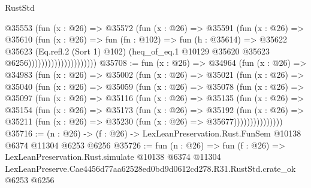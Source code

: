 \begin{lexlean}{RustStd}
\begin{coremodule}
                                  @35553
                                    (fun (x : @26) =>
                                    @35572
                                      (fun (x : @26) =>
                                      @35591
                                        (fun (x : @26) =>
                                        @35610
                                          (fun (x : @26) =>
                                          fun (fn : @102) =>
                                          fun (h : @35614) =>
                                          @35622
                                            @35623
                                            (Eq.refl.{2} (Sort 1) @102)
                                            (heq_of_eq.{1}
                                              @10129
                                              @35620
                                              @35623
                                              @6256)))))))))))))))))))))
@35708 := fun (x : @26) =>
  @34964
    (fun (x : @26) =>
    @34983
      (fun (x : @26) =>
      @35002
        (fun (x : @26) =>
        @35021
          (fun (x : @26) =>
          @35040
            (fun (x : @26) =>
            @35059
              (fun (x : @26) =>
              @35078
                (fun (x : @26) =>
                @35097
                  (fun (x : @26) =>
                  @35116
                    (fun (x : @26) =>
                    @35135
                      (fun (x : @26) =>
                      @35154
                        (fun (x : @26) =>
                        @35173
                          (fun (x : @26) =>
                          @35192
                            (fun (x : @26) =>
                            @35211 (fun (x : @26) => @35230 (fun (x : @26) => @35677)))))))))))))))
@35716 := (n : @26) -> (f : @26) -> LexLeanPreservation.Rust.FunSem @10138 @6374 @11304 @6253 @6256
@35726 := fun (n : @26) =>
  fun (f : @26) =>
  LexLeanPreservation.Rust.simulate
    @10138
    @6374
    @11304
    LexLeanPreserve.Cae4456d77aa62528ed0bd9d0612cd278.R31.RustStd.crate_ok
    @6253
    @6256
\end{coremodule}
\end{lexlean}
